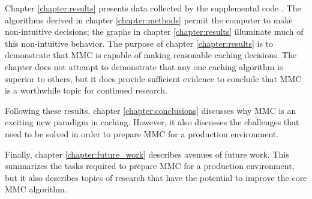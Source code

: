   Chapter \ref{chapter:results} presents data collected by the supplemental code
  \cite{supplimental}. The algorithms derived in chapter \ref{chapter:methods}
  permit the computer to make non-intuitive decisions; the graphs in chapter
  \ref{chapter:results} illuminate much of this non-intuitive behavior. The
  purpose of chapter \ref{chapter:results} is to demonstrate that MMC is capable
  of making reasonable caching decisions. The chapter does not attempt to
  demonstrate that any one caching algorithm is superior to others, but it does
  provide sufficient evidence to conclude that MMC is a worthwhile topic for
  continued research.

  Following these results, chapter \ref{chapter:conclusions} discusses why MMC
  is an exciting new paradigm in caching. However, it also discusses the
  challenges that need to be solved in order to prepare MMC for a production
  environment.

  Finally, chapter \ref{chapter:future_work} describes avenues of future work.
  This summarizes the tasks required to prepare MMC for a production
  environment, but it also describes topics of research that have the potential
  to improve the core MMC algorithm.

